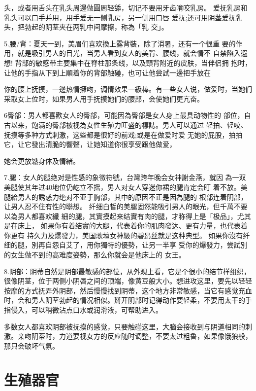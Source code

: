 \documentclass[12pt,UTF8]{ctexbook}
\begin{document}
头，或者用舌头在乳头周邊做圓周轻舔，切记不要用牙齿啃咬乳房。
爱抚乳房和乳头可以口手并用，用手爱无一侧乳房，另一侧用口唇
爱抚;还可用阴茎爱抚乳头，把勃起的阴茎夾在两乳中间摩擦，称為「乳
交」。

5.腰/背：夏天一到，美眉们喜欢換上露背裝，除了消暑，还有一个很重
要的作用，就是吸引男人的目光，当男人看到女人的美背、腰线，就会情不
自禁陷入遐想!
背部的敏感带主要集中在脊柱那条线，以及頸背附近的皮肤，当伴侣拥
抱时，让他的手指从下到上順着你的背部触碰，也可让他尝試一邊把手放在

你的腰上抚摸，一邊热情擁吻，调情效果一級棒。有一些女人说，做爱时，当她们采取女上位时，如果男人用手抚摸她们的腰部，会使她们更亢奋。

6臀部：男人都喜歡女人的臀部，可能因為臀部是女人身上最具动物性的
部位，自古以来，飽满的臀部被视為女性生殖力旺盛的標誌。男人可以通过
轻拍、轻咬、抚摸等多种方式刺激，这些都是很好的前戏;或是在做爱时爱
无她的屁股，拍拍它，让它發出清脆的響聲，让她知道你很享受跟他做爱，

她会更放鬆身体及情緒。

7.腿：女人的腿绝对是性感的象徵符號，台灣跨年晚会女神謝金燕，就因
為一双美腿使其年过40地位仍屹立不摇，男人对女人穿迷你裙的腿肯定会盯
着不放。美腿給男人的誘惑力绝对不亚于胸部，其中的原因不正是因為腿的
根部连着阴部，让男人忍不住有性的聯想。
纤细白皙的美腿固然能吸引男人的眼光，但千萬不要以為男人都喜欢纖
細的腿，其實摸起来结實有肉的腿，才称得上是「极品」，尤其是在床上，
如果你有着结實的大腿，代表着你的肌肉發达、更有力量，也代表着你更有
持久力及爆發力，美国歌壇女神級的碧昂丝就是这种典型。
如果你沒有纤细的腿，別再自怨自艾了，用你獨特的優勢，让另一半享
受你的爆發力，尝試別的女生做不到的高难度姿勢，那么你就会是他床上的
女王。

8.阴部：阴蒂自然是阴部最敏感的部位，从外观上看，它是个很小的结节样组织，很像阴茎，位于两侧小阴唇之间的顶端，像黄豆般大小。想进攻这里，要先以轻轻按摩的方式抚弄外阴部，然后慢慢找到阴蒂，这个地方非常敏感，当它有感觉充血时，会和男人阴茎勃起的情况相似。掰开阴部时记得动作要轻柔，不要用太干的手指侵入，可以稍微沾点口水或润滑液，可帮助进入。

多数女人都喜欢阴部被抚摸的感觉，只要触碰这里，大脑会接收到与阴道相同的刺激。亲吻阴蒂时，力道要视女方的反应随时调整，不要太过粗鲁，如果像饿狼般，那只会破坏气氛。


\mainmatter

\part{生殖器官}
\end{document}
